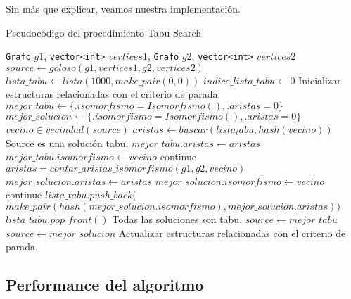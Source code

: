 Sin más que explicar, veamos nuestra implementación.


\begin{algorithm}[H]
  \begin{algorithmic}[1]
  \caption{Pseudocódigo del procedimiento Tabu Search}
  \label{algo:6-1}
              {\texttt{Grafo} $g1$,
               \texttt{vector<int>} $vertices1$,
               \texttt{Grafo} $g2$,
               \texttt{vector<int>} $vertices2$} 
    \State $source \gets goloso(g1, vertices1, g2, vertices2)$
    \State $lista\_tabu \gets lista(1000, make\_pair(0, 0))$
    \State $indice\_lista\_tabu \gets 0$
    \State Inicializar estructuras relacionadas con el criterio de parada.
       \State $mejor\_tabu \gets \{.isomorfismo = Isomorfismo(), .aristas = 0\}$
       \State $mejor\_solucion \gets \{.isomorfismo = Isomorfismo(), .aristas = 0\}$
       \For $vecino \in vecindad(source)$
           \State $aristas \gets buscar(lista_tabu, hash(vecino))$
               \Comment Source es una solución tabu.
                   \State $mejor\_tabu.aristas \gets aristas$
                   \State $mejor\_tabu.isomorfismo \gets vecino$
                   \State continue
               \EndIf
           \Else
               \State $aristas = contar\_aristas\_isomorfismo(g1, g2, vecino)$
                   \State $mejor\_solucion.aristas \gets aristas$
                   \State $mejor\_solucion.isomorfismo \gets vecino$
                   \State continue
               \EndIf
           \EndIf
        \EndFor
            \State $lista\_tabu.push\_back($
            \State \,\,  $make\_pair(
              hash(mejor\_solucion.isomorfismo),
              mejor\_solucion.aristas))$
                 \State $lista\_tabu.pop\_front()$
            \EndIf
        \EndIf
           \Comment Todas las soluciones son tabu.
           \State $source \gets mejor\_tabu$
       \Else
           \State $source \gets mejor\_solucion$
       \EndIf
       \State Actualizar estructuras relacionadas con el criterio de parada.
    \EndWhile
           
		\EndProcedure
	\end{algorithmic}
\end{algorithm}






\subsection{Performance del algoritmo}


